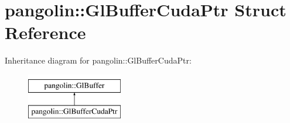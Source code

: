 \hypertarget{structpangolin_1_1_gl_buffer_cuda_ptr}{}\section{pangolin\+:\+:Gl\+Buffer\+Cuda\+Ptr Struct Reference}
\label{structpangolin_1_1_gl_buffer_cuda_ptr}
Inheritance diagram for pangolin\+:\+:Gl\+Buffer\+Cuda\+Ptr\+:\begin{figure}[H]
\begin{center}
\leavevmode
\includegraphics[height=2.000000cm]{structpangolin_1_1_gl_buffer_cuda_ptr}
\end{center}
\end{figure}
